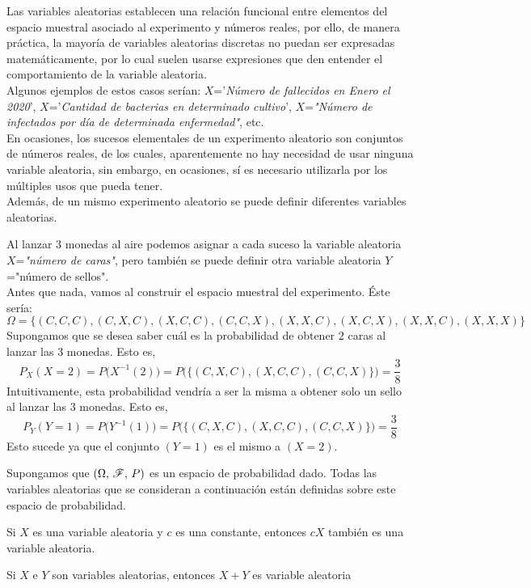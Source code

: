 Las variables aleatorias establecen una relación funcional entre elementos del espacio muestral asociado al experimento y números reales, por ello, de manera práctica, la mayoría de variables aleatorias discretas no puedan ser expresadas matemáticamente, por lo cual suelen usarse expresiones que den entender el comportamiento de la variable aleatoria. \\Algunos ejemplos de estos casos serían: $X$='\textit{Número de fallecidos en Enero el 2020}', $X$='\textit{Cantidad de bacterias en determinado cultivo}', $X$=\textit{"Número de infectados por día de determinada enfermedad"}, etc.\\
En ocasiones, los sucesos elementales de un experimento aleatorio son conjuntos de números reales, de los cuales, aparentemente no hay necesidad de usar ninguna variable aleatoria, sin embargo, en ocasiones, sí es necesario utilizarla por los múltiples usos que pueda tener.\\
Además, de un mismo experimento aleatorio se puede definir diferentes variables aleatorias.
\begin{Ejm}
    Al lanzar $3$ monedas al aire podemos asignar a cada suceso la variable aleatoria $X$=\textit{"número de caras"}, pero también se puede definir otra variable aleatoria $Y$="número de sellos". \\
    Antes que nada, vamos al construir el espacio muestral del experimento. Éste sería:
    $$\Omega = \{(C,C,C),(C,X,C), (X,C,C), (C,C,X), (X,X,C), (X,C,X), (X,X,C), (X,X,X)\}$$
Supongamos que se desea saber cuál es la probabilidad de obtener $2$ caras al lanzar las $3$ monedas.
Esto es, $$P_{X}(X=2)= P\big(X^{-1}(2)\big)= P\big(\big\{(C,X,C), (X,C,C), (C,C,X)\big\}\big)=\frac{3}{8}$$
Intuitivamente, esta probabilidad vendría a ser la misma a obtener solo un sello al lanzar las $3$ monedas.
Esto es,
$$P_{Y}(Y=1)= P\big(Y^{-1}(1)\big)= P\big(\big\{(C,X,C), (X,C,C), (C,C,X)\big\}\big)=\frac{3}{8}$$
Esto sucede ya que el conjunto $(Y=1)$ es el mismo a $(X=2)$.
\end{Ejm}
Supongamos que $(\Omega,\thinspace \mathscr{F},\thinspace P)$ es un espacio de probabilidad dado. Todas las variables aleatorias que se consideran a continuación están definidas sobre este espacio de probabilidad.
\begin{Prop}
    Si $X$ es una variable aleatoria y $c$ es una constante, entonces $c X$ también es una variable aleatoria.
    \label{prop-variableAl-cXesVA}
\end{Prop}
\begin{Prop}
    Si $X$ e $Y$ son variables aleatorias, entonces $X+Y$ es variable aleatoria
    \label{prop-variableAl-X+YesVA}
\end{Prop}
